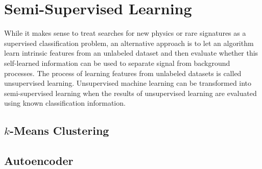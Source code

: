 \section{Semi-Supervised Learning}
\label{sec:semisupervised}
While it makes sense to treat searches for new physics or rare signatures as a supervised classification problem, an alternative approach is to let an algorithm learn intrinsic features from an unlabeled dataset and then evaluate whether this self-learned information can be used to separate signal from background processes. The process of learning features from unlabeled datasets is called unsupervised learning. Unsupervised machine learning can be transformed into semi-supervised learning when the results of unsupervised learning are evaluated using known classification information.

\subsection{$k$-Means Clustering}


\subsection{Autoencoder}


